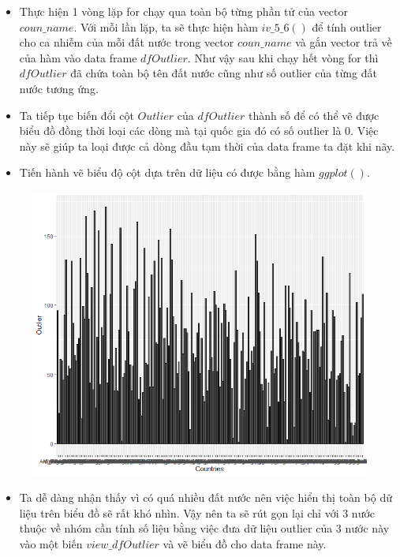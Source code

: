 \documentclass[a4paper]{article}
\theoremstyle{definition}
\begin{document}
\begin{enumerate}[i)]
\begin{enumerate}[1)]
\begin{itemize}
    \item Thực hiện 1 vòng lặp for chạy qua toàn bộ từng phần tử của vector $coun\_name$. Với mỗi lần lặp, ta sẽ thực hiện hàm $iv\_5\_6()$ để tính outlier cho ca nhiễm của mỗi đất nước trong vector $coun\_name$ và gắn vector trả về của hàm vào data frame $dfOutlier$. Như vậy sau khi chạy hết vòng for thì $dfOutlier$ đã chứa toàn bộ tên đất nước cũng như số outlier của từng đất nước tương ứng.
    \item Ta tiếp tục biến đổi cột $Outlier$ của $dfOutlier$ thành số để có thể vẽ được biểu đồ đồng thời loại các dòng mà tại quốc gia đó có số outlier là 0. Việc này sẽ giúp ta loại được cả dòng đầu tạm thời của data frame ta đặt khi nãy.
    \item Tiến hành vẽ biểu độ cột dựa trên dữ liệu có được bằng hàm $ggplot()$.
\end{itemize}
\newpage
\begin{figure}[h!]
	\begin{center}
        \includegraphics[scale=0.8]{Images/IV/iv (5) - 1.png}
	\end{center}
\end{figure}
\begin{itemize}
    \item Ta dễ dàng nhận thấy vì có quá nhiều đất nước nên việc hiển thị toàn bộ dữ liệu trên biểu đồ sẽ rất khó nhìn. Vậy nên ta sẽ rút gọn lại chỉ với 3 nước thuộc về nhóm cần tính số liệu bằng việc đưa dữ liệu outlier của 3 nước này vào một biến $view\_dfOutlier$ và vẽ biểu đồ cho data frame này.

\end{itemize}
\end{enumerate}
\end{enumerate}
\end{document}

